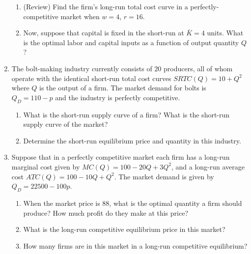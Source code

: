 \documentclass[11pt]{article}
\newcommand{\answer}[1]{\iftoggle{INCLUDEANSWERS}{{\color{violet!70!white}\textbf{Solution:} #1}}{} }
\begin{document}
\begin{enumerate}
  \begin{enumerate}
    \item (Review) Find the firm's long-run total cost curve in a perfectly-competitive market when $w = 4$, $r = 16$.
    
    \answer{
      The optimality condition is given by 
      $$
        \frac{5 K^{1/2} L^{-1/2}}{4} = \frac{5 K^{-1/2} L^{1/2}}{16} \implies K = L/4.
      $$
      Plugging that into the production constraint $Q = 10 K^{1/2} L^{1/2}$ yields $K^*(Q) = Q/20$ and $L^*(Q) = Q/5$. This produces a total cost curve of $TC(Q) = 40 + 8/5Q$
    }
    
    \item Now, suppose that capital is fixed in the short-run at $\bar{K} = 4$ units. What is the optimal labor and capital inputs as a function of output quantity $Q$?
  \end{enumerate}


  \item The bolt-making industry currently consists of $20$ producers, all of whom operate with the identical short-run total cost curves $SRTC(Q) = 10 + Q^2$ where $Q$ is the output of a firm. The market demand for bolts is $Q_D = 110 − p$ and the industry is perfectly competitive.
  
  \begin{enumerate}
    \item What is the short-run supply curve of a firm? What is the short-run supply curve of the market?
    
    \item Determine the short-run equilibrium price and quantity in this industry.
  \end{enumerate}

  \item Suppose that in a perfectly competitive market each firm has a long-run marginal cost given by $MC(Q) = 100 − 20Q + 3Q^2$, and a long-run average cost $ATC(Q) = 100 − 10Q + Q^2$. The market demand is given by $Q_D = 22500 − 100p$.
  
  \begin{enumerate}
    \item When the market price is $88$, what is the optimal quantity a firm should produce? How much profit do they make at this price?
    
    \item What is the long-run competitive equilibrium price in this market?
    
    \item How many firms are in this market in a long-run competitive equilibrium?
  \end{enumerate}

\end{enumerate}
\end{document}
